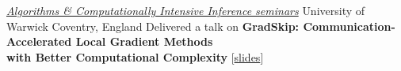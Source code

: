 \documentclass[10pt,a4paper,sans]{moderncv}        %
\newcommand{\kaust}{KAUST}
\newcommand{\yerevan}{Yerevan, Armenia}
\newcommand{\thuwal}{Thuwal, Saudi Arabia}
\newcommand{\ysu}{Yerevan State University}
\begin{document}




  {\textcolor{accent}{\href{https://warwick.ac.uk/fac/sci/statistics/news/algorithms-seminars/\#:\textasciitilde:text=06/10-,Artavazd\%20Maranjyan,-Link\%20opens\%20in}{\textit{Algorithms \& Computationally Intensive Inference seminars}}}}
  {University of Warwick}
  {Coventry, England}
  {}
  {
    Delivered a talk on \textbf{GradSkip: Communication-Accelerated Local Gradient Methods \\ with Better Computational Complexity} [{\href{https://warwick.ac.uk/fac/sci/statistics/news/algorithms-seminars/slides_2023_10_06_arto_maranjyan_gradskip.pdf}{slides}}]
  }


\end{document}
